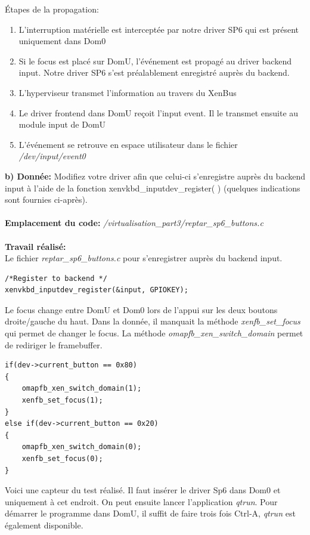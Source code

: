 Étapes de la propagation:
\begin{enumerate}
	\item L'interruption matérielle est interceptée par notre driver SP6 qui est présent uniquement dans Dom0
	\item Si le focus est placé sur DomU, l'événement est propagé au driver backend input. Notre driver SP6 s'est préalablement enregistré auprès du backend.
	\item L'hyperviseur transmet l'information au travers du XenBus
	\item Le driver frontend dans DomU reçoit l'input event. Il le transmet ensuite au module input de DomU
	\item L'événement se retrouve en espace utilisateur dans le fichier \textit{/dev/input/event0}\\
\end{enumerate}
\textbf{b) Donnée: }Modifiez votre driver afin que celui-ci s'enregistre auprès du backend input à l'aide de la fonction
xenvkbd\_inputdev\_register( ) (quelques indications sont fournies ci-après).\\\\
\textbf{Emplacement du code: }\textit{/virtualisation\_part3/reptar\_sp6\_buttons.c}\\\\
\textbf{Travail réalisé: }\\Le fichier \textit{reptar\_sp6\_buttons.c} pour s'enregistrer auprès du backend input.
\begin{lstlisting}
/*Register to backend */
xenvkbd_inputdev_register(&input, GPIOKEY);
\end{lstlisting}
Le focus change entre DomU et Dom0 lors de l'appui sur les deux boutons droite/gauche du haut. Dans la donnée, il manquait la méthode \textit{xenfb\_set\_focus} qui permet de changer le focus. La méthode \textit{omapfb\_xen\_switch\_domain} permet de rediriger le framebuffer.
\begin{lstlisting}
if(dev->current_button == 0x80)
{
	omapfb_xen_switch_domain(1);
	xenfb_set_focus(1);
}
else if(dev->current_button == 0x20)
{
	omapfb_xen_switch_domain(0);
	xenfb_set_focus(0);
}
\end{lstlisting}
Voici une capteur du test réalisé. Il faut insérer le driver Sp6 dans Dom0 et uniquement à cet endroit. On peut ensuite lancer l'application \textit{qtrun}. Pour démarrer le programme dans DomU, il suffit de faire trois fois Ctrl-A, \textit{qtrun} est également disponible.
